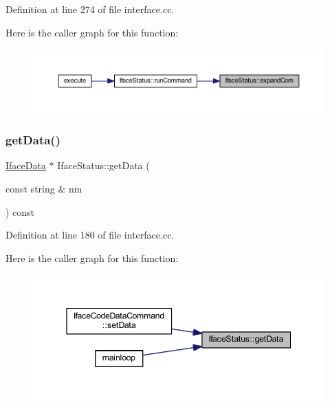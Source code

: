 Definition at line 274 of file interface.\+cc.

Here is the caller graph for this function\+:
\nopagebreak
\begin{figure}[H]
\begin{center}
\leavevmode
\includegraphics[width=350pt]{class_iface_status_adb7a0b05e7487a3f75dcb3de2a447b45_icgraph}
\end{center}
\end{figure}
\mbox{\label{class_iface_status_af88322ddf5aa11ccdc483193a0a64152}} 
\subsubsection{\texorpdfstring{getData()}{getData()}}
{\footnotesize\ttfamily \mbox{\hyperlink{class_iface_data}{Iface\+Data}} $\ast$ Iface\+Status\+::get\+Data (\begin{DoxyParamCaption}\item[{const string \&}]{nm }\end{DoxyParamCaption}) const}



Definition at line 180 of file interface.\+cc.

Here is the caller graph for this function\+:
\nopagebreak
\begin{figure}[H]
\begin{center}
\leavevmode
\includegraphics[width=345pt]{class_iface_status_af88322ddf5aa11ccdc483193a0a64152_icgraph}
\end{center}
\end{figure}
\mbox{\label{class_iface_status_a2ee164e918fff2ea7901fffa1fb6ad9b}} 
